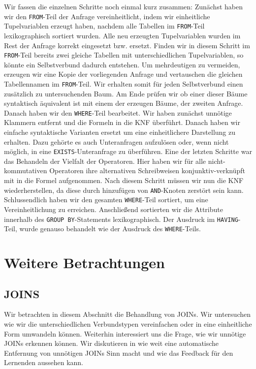 Wir fassen die einzelnen Schritte noch einmal kurz zusammen: Zunächst haben wir den \verb|FROM|-Teil der Anfrage vereinheitlicht, indem wir einheitliche Tupelvariablen erzeugt haben, nachdem alle Tabellen im \verb|FROM|-Teil lexikographisch sortiert wurden. Alle neu erzeugten Tupelvariablen wurden im Rest der Anfrage korrekt eingesetzt bzw. ersetzt. Finden wir in diesem Schritt im \verb|FROM|-Teil bereits zwei gleiche Tabellen mit unterschiedlichen Tupelvariablen, so könnte ein Selbstverbund dadurch entstehen. Um mehrdeutigen zu vermeiden, erzeugen wir eine Kopie der vorliegenden Anfrage und vertauschen die gleichen Tabellennamen im \verb|FROM|-Teil. Wir erhalten somit für jeden Selbstverbund einen zusätzlich zu untersuchenden Baum. Am Ende prüfen wir ob einer dieser Bäume syntaktisch äquivalent ist mit einem der erzeugen Bäume, der zweiten Anfrage. Danach haben wir den \verb|WHERE|-Teil bearbeitet. Wir haben zunächst unnötige Klammern entfernt und die Formeln in die KNF überführt. Danach haben wir einfache syntaktische Varianten ersetzt um eine einheitlichere Darstellung zu erhalten. Dazu gehörte es auch Unteranfragen aufzulösen oder, wenn nicht möglich, in eine \verb|EXISTS|-Unteranfrage zu überführen. Eine der letzten Schritte war das Behandeln der Vielfalt der Operatoren. Hier haben wir für alle nicht-kommutativen Operatoren ihre alternativen Schreibweisen konjunktiv-verknüpft mit in die Formel aufgenommen. Nach diesem Schritt müssen wir nun die KNF wiederherstellen, da diese durch hinzufügen von \verb|AND|-Knoten zerstört sein kann. Schlussendlich haben wir den gesamten \verb|WHERE|-Teil sortiert, um eine Vereinheitlichung zu erreichen. Anschließend sortierten wir die Attribute innerhalb des \verb|GROUP BY|-Statements lexikographisch. Der Ausdruck im \verb|HAVING|-Teil, wurde genauso behandelt wie der Ausdruck des \verb|WHERE|-Teils. 

\section{Weitere Betrachtungen}

\subsection{JOINS}
\label{subsec:joins}

Wir betrachten in diesem Abschnitt die Behandlung von JOINs. Wir untersuchen wie wir die unterschiedlichen Verbundstypen vereinfachen oder in eine einheitliche Form umwandeln können. Weiterhin interessiert uns die Frage, wie wir unnötige JOINs erkennen können. Wir diskutieren in wie weit eine automatische Entfernung von unnötigen JOINs Sinn macht und wie das Feedback für den Lernenden aussehen kann.


